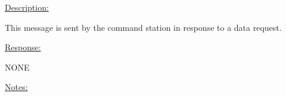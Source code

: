 \underline{Description:}

This message is sent by the command station in response to a data request.

\underline{Response:} 

NONE

\underline{Notes:} 



